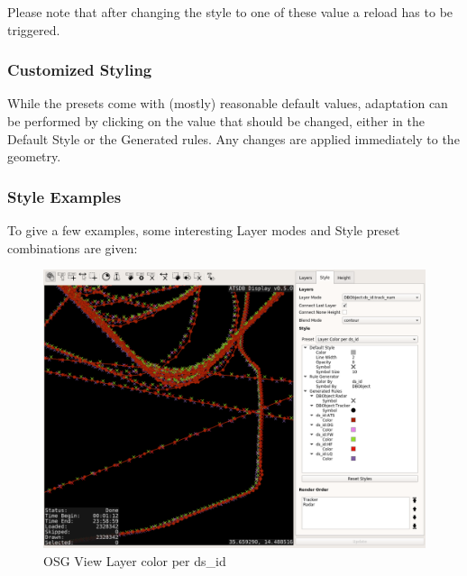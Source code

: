 Please note that after changing the style to one of these value a reload has to be triggered. \\

\subsubsection{Customized Styling}

While the presets come with (mostly) reasonable default values, adaptation can be performed by clicking on the value that should be changed, either in the Default Style or the Generated rules. Any changes are applied immediately to the geometry.

\subsubsection{Style Examples}

To give a few examples, some interesting Layer modes and Style preset combinations are given:

\begin{figure}[H]
    \hspace*{-2.5cm}
    \includegraphics[width=19cm,frame]{figures/osgview_style_ds_id.png}
  \caption{OSG View Layer color per ds\_id}
\end{figure}

